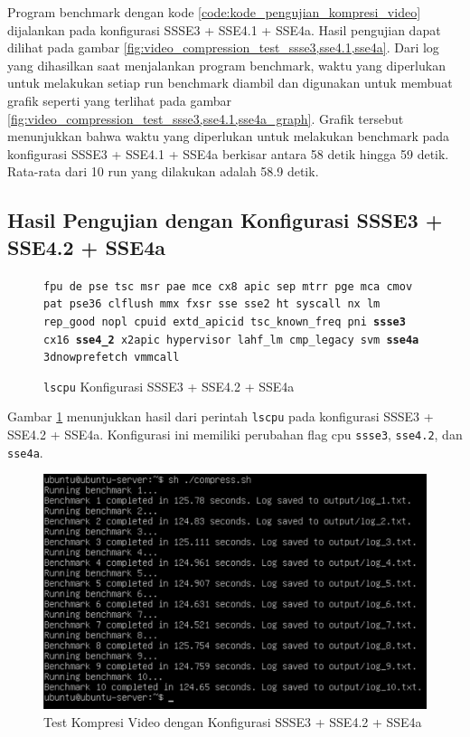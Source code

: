 Program benchmark dengan kode \ref{code:kode_pengujian_kompresi_video} dijalankan pada konfigurasi SSSE3 + SSE4.1 + SSE4a. Hasil pengujian dapat dilihat pada gambar \ref{fig:video_compression_test_ssse3,sse4.1,sse4a}. Dari log yang dihasilkan saat menjalankan program benchmark, waktu yang diperlukan untuk melakukan setiap run benchmark diambil dan digunakan untuk membuat grafik seperti yang terlihat pada gambar \ref{fig:video_compression_test_ssse3,sse4.1,sse4a_graph}. Grafik tersebut menunjukkan bahwa waktu yang diperlukan untuk melakukan benchmark pada konfigurasi SSSE3 + SSE4.1 + SSE4a berkisar antara 58 detik hingga 59 detik. Rata-rata dari 10 run yang dilakukan adalah 58.9 detik.

\subsection{Hasil Pengujian dengan Konfigurasi SSSE3 + SSE4.2 + SSE4a}
\begin{figure}
    \texttt{fpu de pse tsc msr pae mce cx8 apic sep mtrr pge mca cmov pat pse36 clflush mmx fxsr sse sse2 ht syscall nx lm rep\_good nopl cpuid extd\_apicid tsc\_known\_freq pni \textbf{ssse3} cx16 \textbf{sse4\_2} x2apic hypervisor lahf\_lm cmp\_legacy svm \textbf{sse4a} 3dnowprefetch vmmcall}
    \caption{\texttt{lscpu} Konfigurasi SSSE3 + SSE4.2 + SSE4a}
    \label{fig:lscpu_video_compression_test_ssse3,sse4.2,sse4a.jpeg}
\end{figure}

Gambar \ref{fig:lscpu_video_compression_test_ssse3,sse4.2,sse4a.jpeg} menunjukkan hasil dari perintah \texttt{lscpu} pada konfigurasi SSSE3 + SSE4.2 + SSE4a. Konfigurasi ini memiliki perubahan flag cpu \texttt{ssse3}, \texttt{sse4.2}, dan \texttt{sse4a}.

\begin{figure}
    \centering
    \includegraphics[width=1\textwidth]
    {assets/pics/video-compression-test/ssse3,sse4.2,sse4a.jpeg}
    \caption{Test Kompresi Video dengan Konfigurasi SSSE3 + SSE4.2 + SSE4a}
    \label{fig:video_compression_test_ssse3,sse4.2,sse4a.jpeg}
\end{figure}

